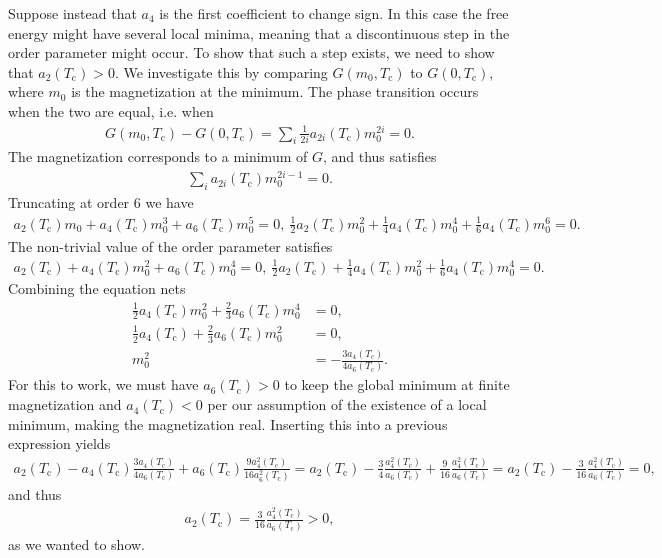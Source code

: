Suppose instead that $a_{4}$ is the first coefficient to change sign. In this case the free energy might have several local minima, meaning that a discontinuous step in the order parameter might occur. To show that such a step exists, we need to show that $a_{2}(T_{\text{c}}) > 0$. We investigate this by comparing $G(m_{0}, T_{\text{c}})$ to $G(0, T_{\text{c}})$, where $m_{0}$ is the magnetization at the minimum. The phase transition occurs when the two are equal, i.e. when
\begin{align*}
	G(m_{0}, T_{\text{c}}) - G(0, T_{\text{c}}) = \sum\limits_{i}\frac{1}{2i}a_{2i}(T_{\text{c}})m_{0}^{2i} = 0.
\end{align*}
The magnetization corresponds to a minimum of $G$, and thus satisfies
\begin{align*}
	\sum\limits_{i}a_{2i}(T_{\text{c}})m_{0}^{2i - 1} = 0.
\end{align*}
Truncating at order $6$ we have
\begin{align*}
	a_{2}(T_{\text{c}})m_{0} + a_{4}(T_{\text{c}})m_{0}^{3} + a_{6}(T_{\text{c}})m_{0}^{5} = 0,\ \frac{1}{2}a_{2}(T_{\text{c}})m_{0}^{2} + \frac{1}{4}a_{4}(T_{\text{c}})m_{0}^{4} + \frac{1}{6}a_{4}(T_{\text{c}})m_{0}^{6} = 0.
\end{align*}
The non-trivial value of the order parameter satisfies
\begin{align*}
a_{2}(T_{\text{c}}) + a_{4}(T_{\text{c}})m_{0}^{2} + a_{6}(T_{\text{c}})m_{0}^{4} = 0,\ \frac{1}{2}a_{2}(T_{\text{c}}) + \frac{1}{4}a_{4}(T_{\text{c}})m_{0}^{2} + \frac{1}{6}a_{4}(T_{\text{c}})m_{0}^{4} = 0.
\end{align*}
Combining the equation nets
\begin{align*}
	\frac{1}{2}a_{4}(T_{\text{c}})m_{0}^{2} + \frac{2}{3}a_{6}(T_{\text{c}})m_{0}^{4} &= 0, \\
	\frac{1}{2}a_{4}(T_{\text{c}}) + \frac{2}{3}a_{6}(T_{\text{c}})m_{0}^{2}          &= 0, \\
	m_{0}^{2}                                                                         &= -\frac{3a_{4}(T_{\text{c}})}{4a_{6}(T_{\text{c}})}.
\end{align*}
For this to work, we must have $a_{6}(T_{\text{c}}) > 0$ to keep the global minimum at finite magnetization and $a_{4}(T_{\text{c}}) < 0$ per our assumption of the existence of a local minimum, making the magnetization real. Inserting this into a previous expression yields
\begin{align*}
	a_{2}(T_{\text{c}}) - a_{4}(T_{\text{c}})\frac{3a_{4}(T_{\text{c}})}{4a_{6}(T_{\text{c}})} + a_{6}(T_{\text{c}})\frac{9a_{4}^{2}(T_{\text{c}})}{16a_{6}^{2}(T_{\text{c}})} = a_{2}(T_{\text{c}}) - \frac{3}{4}\frac{a_{4}^{2}(T_{\text{c}})}{a_{6}(T_{\text{c}})} + \frac{9}{16}\frac{a_{4}^{2}(T_{\text{c}})}{a_{6}(T_{\text{c}})} = a_{2}(T_{\text{c}}) - \frac{3}{16}\frac{a_{4}^{2}(T_{\text{c}})}{a_{6}(T_{\text{c}})} = 0,
\end{align*}
and thus
\begin{align*}
	a_{2}(T_{\text{c}}) = \frac{3}{16}\frac{a_{4}^{2}(T_{\text{c}})}{a_{6}(T_{\text{c}})} > 0,
\end{align*}
as we wanted to show.

